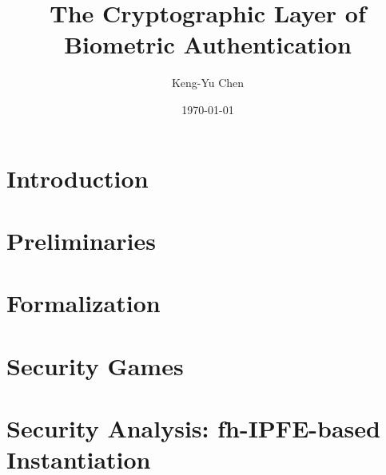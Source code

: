 







\title{\textbf{The Cryptographic Layer of Biometric Authentication}}
\author{Keng-Yu Chen}
\date{\today}

\maketitle


\pagestyle{fancy}
\fancyhf{}
\fancyfoot[C]{\thepage}



\section{Introduction}
\label{sec:introdiction}


\section{Preliminaries}
\label{sec:preliminaries}


\section{Formalization}
\label{sec:formalization}


\section{Security Games}
\label{sec:security_game}


\section{Security Analysis: fh-IPFE-based Instantiation}
\label{sec:security_analysis:fh-IPFE}


